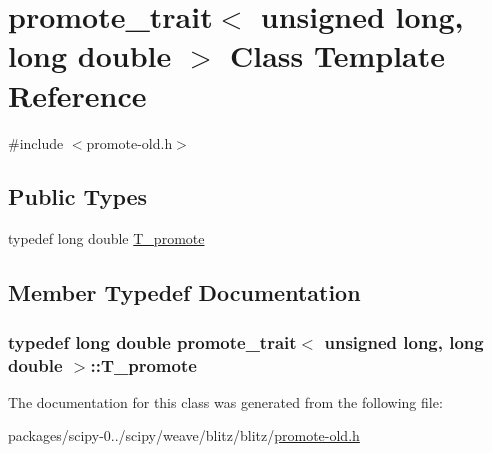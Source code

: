 \hypertarget{classpromote__trait_3_01unsigned_01long_00_01long_01double_01_4}{}\section{promote\+\_\+trait$<$ unsigned long, long double $>$ Class Template Reference}
\label{classpromote__trait_3_01unsigned_01long_00_01long_01double_01_4}


{\ttfamily \#include $<$promote-\/old.\+h$>$}

\subsection*{Public Types}
\begin{DoxyCompactItemize}
\item 
typedef long double \hyperlink{classpromote__trait_3_01unsigned_01long_00_01long_01double_01_4_aaf121196004bd83cfa0459b4a744f3f3}{T\+\_\+promote}
\end{DoxyCompactItemize}


\subsection{Member Typedef Documentation}
\hypertarget{classpromote__trait_3_01unsigned_01long_00_01long_01double_01_4_aaf121196004bd83cfa0459b4a744f3f3}{}
\subsubsection[{T\+\_\+promote}]{\setlength{\rightskip}{0pt plus 5cm}typedef long double {\bf promote\+\_\+trait}$<$ unsigned long, long double $>$\+::{\bf T\+\_\+promote}}\label{classpromote__trait_3_01unsigned_01long_00_01long_01double_01_4_aaf121196004bd83cfa0459b4a744f3f3}


The documentation for this class was generated from the following file\+:\begin{DoxyCompactItemize}
\item 
packages/scipy-\/0../scipy/weave/blitz/blitz/\hyperlink{promote-old_8h}{promote-\/old.\+h}\end{DoxyCompactItemize}
